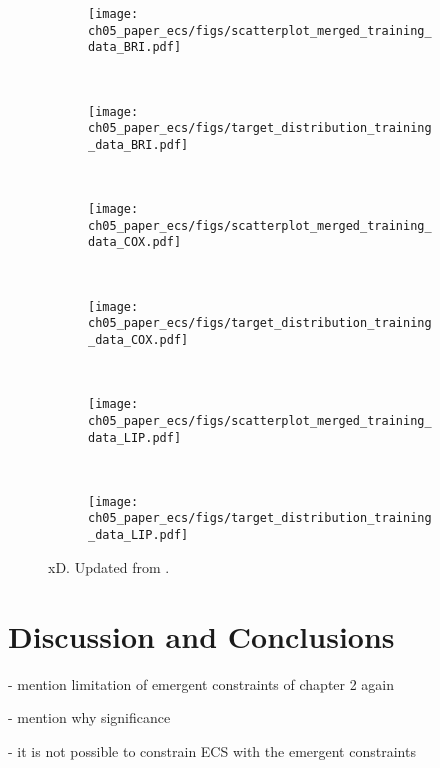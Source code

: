 \begin{figure}[p]
  \centering
  \begin{subfigure}[b]{\SubfigureWidth{}}
    \texttt{[image: 
      ch05\_paper\_ecs/figs/scatterplot\_merged\_training\_data\_BRI.pdf]}
    \caption{}
    \label{fig:05:bri_cox_lip:a}
  \end{subfigure}
  ~
  \begin{subfigure}[b]{\SubfigureWidth{}}
    \texttt{[image: 
      ch05\_paper\_ecs/figs/target\_distribution\_training\_data\_BRI.pdf]}
    \caption{}
    \label{fig:05:bri_cox_lip:b}
  \end{subfigure}
  \\
  \begin{subfigure}[b]{\SubfigureWidth{}}
    \texttt{[image: 
      ch05\_paper\_ecs/figs/scatterplot\_merged\_training\_data\_COX.pdf]}
    \caption{}
    \label{fig:05:bri_cox_lip:c}
  \end{subfigure}
  ~
  \begin{subfigure}[b]{\SubfigureWidth{}}
    \texttt{[image: 
  ch05\_paper\_ecs/figs/target\_distribution\_training\_data\_COX.pdf]}
    \caption{}
    \label{fig:05:bri_cox_lip:d}
  \end{subfigure}
  \\
  \begin{subfigure}[b]{\SubfigureWidth{}}
    \texttt{[image: 
      ch05\_paper\_ecs/figs/scatterplot\_merged\_training\_data\_LIP.pdf]}
    \caption{}
    \label{fig:05:bri_cox_lip:e}
  \end{subfigure}
  ~
  \begin{subfigure}[b]{\SubfigureWidth{}}
    \texttt{[image: 
  ch05\_paper\_ecs/figs/target\_distribution\_training\_data\_LIP.pdf]}
    \caption{}
    \label{fig:05:bri_cox_lip:f}
  \end{subfigure}
  \caption{xD. Updated from
    \textcite{Schlund2020a}.}
  \label{fig:05:bri_cox_lip}
\end{figure}


\section{Discussion and Conclusions}
\label{sec:05:discussion_and_conclusions}

- mention limitation of emergent constraints of chapter 2 again

- mention why significance

- it is not possible to constrain ECS with the emergent constraints
